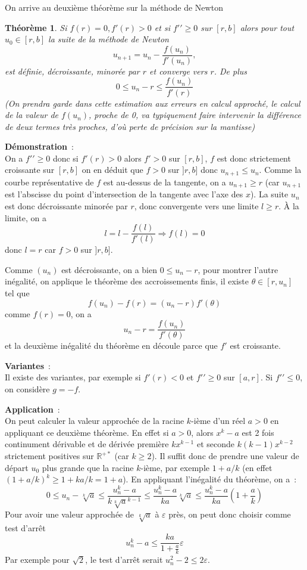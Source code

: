 \documentclass[a4paper,11pt]{article}
\newtheorem{thm}{Théorème}
\newcommand{\R}{{\mathbb{R}}}
\begin{document}
On arrive au deuxième théorème sur la méthode de Newton
\begin{thm} 
Si $f(r)=0, f'(r)>0$ et si $f'{'} \geq 0$ sur $[r,b]$ alors
pour tout $u_0 \in [r,b]$ la suite de la méthode de Newton
\[ u_{n+1} = u_n -\frac{f(u_n)}{f'(u_n)},  \]
est définie, décroissante, minorée par $r$ et converge vers 
$r$. De plus
\[ 0 \leq u_n -r \leq \frac{f(u_n)}{f'(r)} \]
(On prendra garde dans cette estimation aux erreurs en calcul
approch\'e, le calcul de la valeur de $f(u_n)$, proche de 0, va typiquement
faire intervenir la diff\'erence de deux termes tr\`es proches,
d'o\`u perte de pr\'ecision sur la mantisse)
\end{thm}

{\bf Démonstration}~:\\
On a $f'{'} \geq 0$ donc si $f'(r)>0$ alors $f'>0$
sur $[r,b]$, $f$ est donc strictement croissante sur $[r,b]$
on en déduit que $f>0$ sur $]r,b]$ donc $u_{n+1} \leq u_n$.
Comme la courbe représentative de $f$ est au-dessus de la tangente,
on a $u_{n+1} \geq r$ (car $u_{n+1}$ est l'abscisse du point
d'intersection de la tangente avec l'axe des $x$). 
La suite $u_n$ est donc décroissante minorée par $r$, donc convergente
vers une limite $l\geq r$. \`A la limite, on a 
\[ l=l-\frac{f(l)}{f'(l)} \Rightarrow f(l)=0 \]
donc $l=r$ car $f>0$ sur $]r,b]$.

Comme $(u_n)$ est d\'ecroissante, on a bien $0 \leq u_n -r$,
pour montrer l'autre in\'egalit\'e, on applique le th\'eor\`eme
des accroissements finis, il existe $\theta \in [r,u_n]$ tel que
\[ f(u_n)-f(r)=(u_n-r)f'(\theta) \]
comme $f(r)=0$, on a
\[ u_n-r = \frac{f(u_n)}{f'(\theta)} \]
et la deuxi\`eme in\'egalit\'e du th\'eor\`eme
en d\'ecoule parce que $f'$ est croissante.

{\bf Variantes}~:\\
Il existe des variantes, par exemple si $f'(r)<0$ et $f'{'} \geq 0$
sur $[a,r]$. Si $f'{'} \leq 0$, on considère $g=-f$.

{\bf Application}~:\\
On peut calculer la valeur approch\'ee de la 
racine $k$-i\`eme d'un r\'eel $a>0$ en appliquant ce deuxi\`eme
th\'eor\`eme. En effet si
$a>0$, alors $x^k-a$ est 2 fois continument d\'erivable et 
de d\'eriv\'ee premi\`ere $kx^{k-1} $ et
seconde $k(k-1)x^{k-2}$ strictement positives sur $\R^{+\ast}$ (car $k \geq 2$).
Il suffit donc de prendre une valeur de d\'epart $u_0$ plus grande que
la racine $k$-i\`eme, par exemple $1+a/k$ (en effet
$(1+a/k)^k \geq 1+k a/k=1+a$).
En appliquant l'in\'egalit\'e du th\'eor\`eme, on a~:
\[ 0 \leq u_n - \sqrt[k]{a} \leq  
\frac{u_n^k - a}{k\sqrt[k]{a}^{k-1} }
\leq \frac{u_n^k-a}{ka}  \sqrt[k]{a}
\leq \frac{u_n^k-a}{ka} (1+\frac{a}{k})
\]
Pour avoir une valeur approch\'ee de $\sqrt[k]{a}$ \`a $\varepsilon$ pr\`es,
on peut donc choisir comme test d'arr\^et 
\[ u_n^k -a \leq \frac{ka}{1+\frac{a}{k}} \varepsilon \]
Par exemple pour $\sqrt{2}$, le test d'arr\^et serait 
$u_n^2-2 \leq 2 \varepsilon$.
\end{document}
